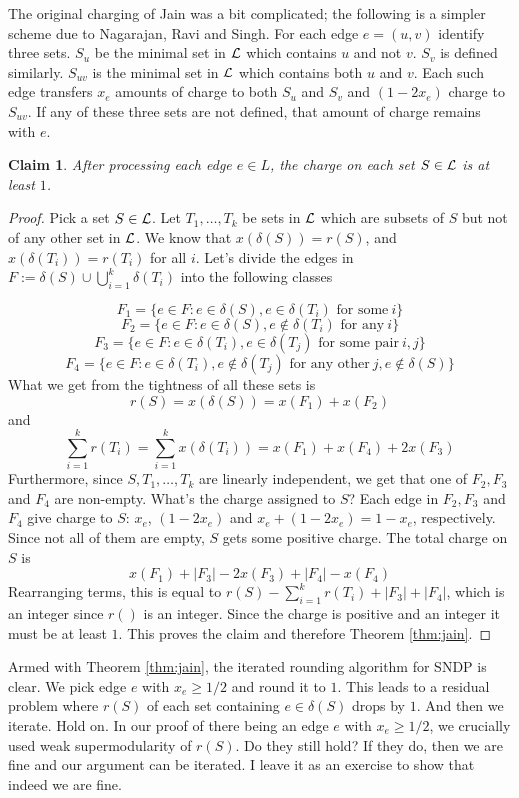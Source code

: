 \documentclass[11pt]{article}
\newtheorem{claim}{Claim}
\begin{document}
\noindent
The original charging of Jain was a bit complicated; the following is a simpler scheme due to Nagarajan, Ravi and Singh. For each edge $e = (u,v)$ identify three sets. $S_u$ be the minimal set in ${\mathcal L}$ which contains $u$ and not $v$. $S_v$ is defined similarly. $S_{uv}$ is the minimal set in ${\mathcal L}$ which contains both $u$ and $v$.
Each such edge transfers $x_e$ amounts of charge to both $S_u$ and $S_v$ and $(1-2x_e)$ charge to $S_{uv}$. If any of these three sets are not defined, that amount of charge remains with $e$. 
\begin{claim}
After processing each edge $e\in L$, the charge on each set $S\in {\mathcal L}$ is at least $1$.
\end{claim}
\begin{proof}
Pick a set $S\in {\mathcal L}$. Let $T_1,\ldots,T_k$ be sets in ${\mathcal L}$ which are subsets of $S$ but not of any 
other set in ${\mathcal L}$. We know that $x(\delta(S)) = r(S)$, and $x(\delta(T_i)) = r(T_i)$ for all $i$. 
Let's divide the edges in $F := \delta(S) \cup \bigcup_{i=1}^k \delta(T_i)$ into the following classes

$$F_1 = \{e\in F: e\in \delta(S), e\in \delta(T_i) \mbox{ for some} ~i \}$$
$$F_2 = \{e\in F: e\in \delta(S), e\notin \delta(T_i) \mbox{ for any} ~i \}$$
$$F_3 = \{e\in F: e\in \delta(T_i), e\in \delta(T_j) \mbox{ for some pair} ~i,j \}$$
$$F_4 = \{e\in F: e\in \delta(T_i), e\notin \delta(T_j)  \mbox{ for any other} ~j, e\notin \delta(S)\}$$ 
\noindent
What we get from the tightness of all these sets is 
$$r(S) = x(\delta(S)) = x(F_1) + x(F_2)$$ and 
$$\sum_{i=1}^k r(T_i) = \sum_{i=1}^k x(\delta(T_i)) =  x(F_1) + x(F_4) + 2x(F_3)$$
\noindent
Furthermore, since $S, T_1,\ldots,T_k$ are linearly independent, we get that one of $F_2,F_3$ and $F_4$ are non-empty. What's the charge assigned to $S$? Each edge in $F_2,F_3$ and $F_4$ give charge to $S$: $x_e$, $(1 - 2x_e)$ and $x_e + (1 - 2x_e) = 1 - x_e$, respectively. Since not all of them are empty, $S$ gets some positive charge. The total charge on $S$ is 
$$x(F_1) + |F_3| - 2x(F_3) + |F_4| - x(F_4)$$
Rearranging terms, this is equal to $r(S) - \sum_{i=1}^k r(T_i) + |F_3| + |F_4|$, which is an integer since $r()$ is an integer. Since the charge is positive and an integer it must be at least $1$. This proves the claim and therefore Theorem \ref{thm:jain}.
\end{proof}

Armed with Theorem \ref{thm:jain}, the iterated rounding algorithm for SNDP is clear. We pick edge $e$ with $x_e \ge 1/2$ and round it to $1$. This leads to a residual problem where $r(S)$ of each set containing $e\in \delta(S)$ drops by $1$. And then we iterate. Hold on. In our proof of there being an edge $e$ with $x_e \ge 1/2$, we crucially used weak supermodularity of $r(S)$. Do they still hold? If they do, then we are fine and our argument can be iterated. I leave it as an exercise to show that indeed we are fine.
\end{document}
